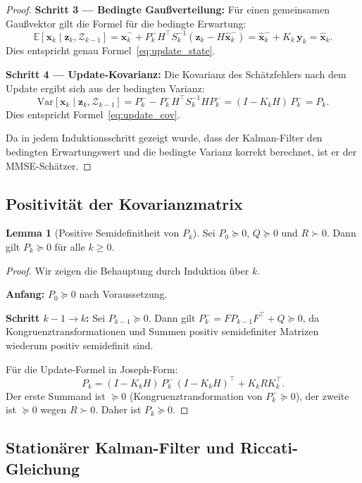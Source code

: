 ﻿\documentclass[a4paper,12pt]{article}
\theoremstyle{definition}
\newtheorem{lemma}{Lemma}
\begin{document}
\begin{proof}
\textbf{Schritt 3 --- Bedingte Gaußverteilung:}
Für einen gemeinsamen Gaußvektor gilt die Formel für die bedingte Erwartung:
\[
    \mathbb{E}[\mathbf{x}_k \mid \mathbf{z}_k, \mathcal{Z}_{k-1}]
    = \hat{\mathbf{x}}_k^- + P_k^- H^\top S_k^{-1}(\mathbf{z}_k - H\hat{\mathbf{x}}_k^-)
    = \hat{\mathbf{x}}_k^- + K_k\,\mathbf{y}_k
    = \hat{\mathbf{x}}_k.
\]
Dies entspricht genau Formel~\eqref{eq:update_state}.

\textbf{Schritt 4 --- Update-Kovarianz:}
Die Kovarianz des Schätzfehlers nach dem Update ergibt sich aus der bedingten Varianz:
\[
    \mathrm{Var}[\mathbf{x}_k \mid \mathbf{z}_k, \mathcal{Z}_{k-1}]
    = P_k^- - P_k^- H^\top S_k^{-1} H P_k^-
    = (I - K_k H)\,P_k^-
    = P_k.
\]
Dies entspricht Formel~\eqref{eq:update_cov}.

Da in jedem Induktionsschritt gezeigt wurde, dass der Kalman-Filter den bedingten
Erwartungswert und die bedingte Varianz korrekt berechnet, ist er der MMSE-Schätzer.
\end{proof}

\subsection{Positivität der Kovarianzmatrix}

\begin{lemma}[Positive Semidefinitheit von $P_k$]
\label{lem:psd}
    Sei $P_0 \succeq 0$, $Q \succeq 0$ und $R \succ 0$. Dann gilt $P_k \succeq 0$ für alle $k \geq 0$.
\end{lemma}

\begin{proof}
Wir zeigen die Behauptung durch Induktion über $k$.

\textbf{Anfang:} $P_0 \succeq 0$ nach Voraussetzung.

\textbf{Schritt $k-1 \to k$:} Sei $P_{k-1} \succeq 0$.
Dann gilt $P_k^- = F P_{k-1} F^\top + Q \succeq 0$, da Kongruenztransformationen
und Summen positiv semidefiniter Matrizen wiederum positiv semidefinit sind.

Für die Update-Formel in Joseph-Form:
\[
    P_k = (I - K_k H)\,P_k^-\,(I - K_k H)^\top + K_k R K_k^\top.
\]
Der erste Summand ist $\succeq 0$ (Kongruenztransformation von $P_k^- \succeq 0$),
der zweite ist $\succeq 0$ wegen $R \succ 0$.
Daher ist $P_k \succeq 0$.
\end{proof}

\subsection{Stationärer Kalman-Filter und Riccati-Gleichung}
\end{document}
